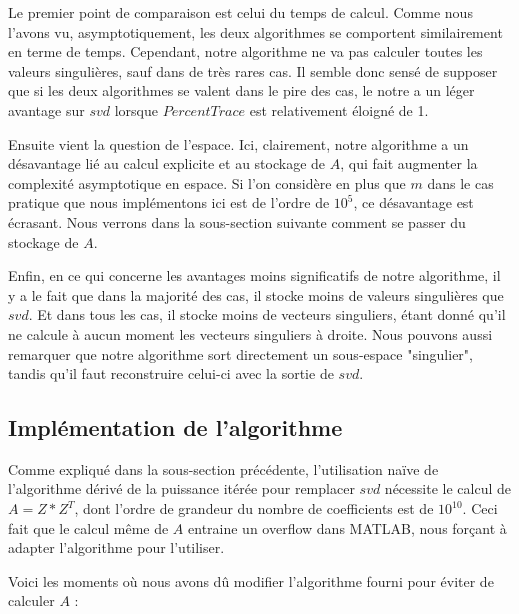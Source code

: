 \documentclass[a4paper,12pt]{article}
\begin{document}
    \bigskip

        Le premier point de comparaison est celui du temps de calcul. Comme nous
        l'avons vu, asymptotiquement, les deux algorithmes se comportent
        similairement en terme de temps. Cependant, notre algorithme ne va pas
        calculer toutes les valeurs singulières, sauf dans de très rares cas. Il
        semble donc sensé de supposer que si les deux algorithmes se valent dans
        le pire des cas, le notre a un léger avantage sur $svd$ lorsque
        $PercentTrace$ est relativement éloigné de 1.

        Ensuite vient la question de l'espace. Ici, clairement, notre algorithme
        a un désavantage lié au calcul explicite et au stockage de $A$, qui fait
        augmenter la complexité asymptotique en espace. Si l'on considère en
        plus que $m$ dans le cas pratique que nous implémentons ici est de
        l'ordre de $10^5$, ce désavantage est écrasant. Nous verrons dans la
        sous-section suivante comment se passer du stockage de $A$.

        Enfin, en ce qui concerne les avantages moins significatifs de notre
        algorithme, il y a le fait que dans la majorité des cas, il stocke moins
        de valeurs singulières que $svd$. Et dans tous les cas, il stocke moins
        de vecteurs singuliers, étant donné qu'il ne calcule à aucun moment les
        vecteurs singuliers à droite. Nous pouvons aussi remarquer que notre
        algorithme sort directement un sous-espace "singulier", tandis qu'il
        faut reconstruire celui-ci avec la sortie de $svd$.

    \subsection{Implémentation de l'algorithme}

        Comme expliqué dans la sous-section précédente, l'utilisation naïve de
        l'algorithme dérivé de la puissance itérée pour remplacer $svd$
        nécessite le calcul de $A = Z*Z^T$, dont l'ordre de grandeur du nombre
        de coefficients est de $10^{10}$. Ceci fait que le calcul même de $A$
        entraine un overflow dans MATLAB, nous forçant à adapter l'algorithme
        pour l'utiliser.

        Voici les moments où nous avons dû modifier l'algorithme fourni pour
        éviter de calculer $A$ :
\end{document}
